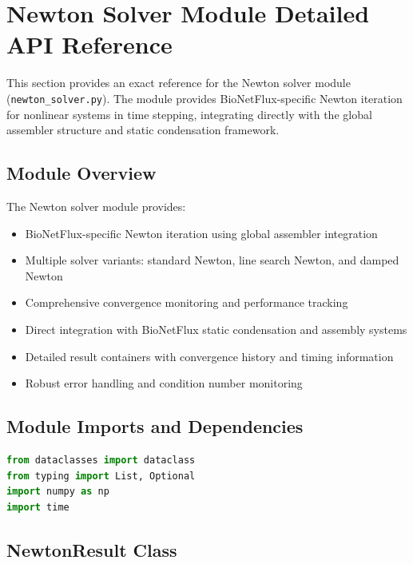 %

\section{Newton Solver Module Detailed API Reference}
\label{sec:newton_solver_module_api}

This section provides an exact reference for the Newton solver module (\texttt{newton\_solver.py}). The module provides BioNetFlux-specific Newton iteration for nonlinear systems in time stepping, integrating directly with the global assembler structure and static condensation framework.

\subsection{Module Overview}

The Newton solver module provides:
\begin{itemize}
    \item BioNetFlux-specific Newton iteration using global assembler integration
    \item Multiple solver variants: standard Newton, line search Newton, and damped Newton
    \item Comprehensive convergence monitoring and performance tracking
    \item Direct integration with BioNetFlux static condensation and assembly systems
    \item Detailed result containers with convergence history and timing information
    \item Robust error handling and condition number monitoring
\end{itemize}

\subsection{Module Imports and Dependencies}

\begin{lstlisting}[language=Python, caption=Module Dependencies]
from dataclasses import dataclass
from typing import List, Optional
import numpy as np
import time
\end{lstlisting}

\subsection{NewtonResult Class}
\label{subsec:newton_result_class}

